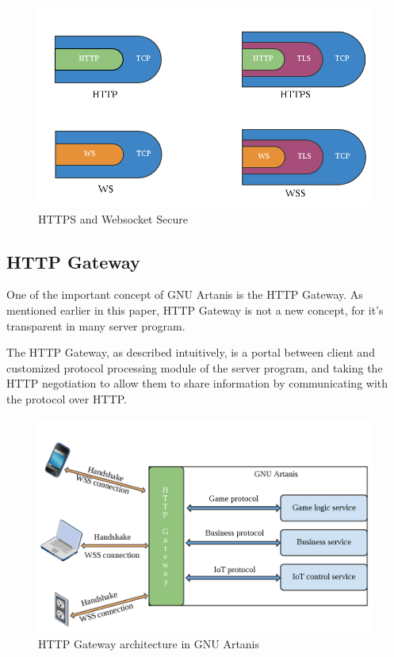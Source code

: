 \documentclass[numbers,numberedpars]{sigplanconf}
\begin{document}
\begin{figure}[tbph]
  \centering
  \label{fig:wss}
  \includegraphics[scale=0.3]{wss.png}
  \caption{HTTPS and Websocket Secure}
\end{figure}

\subsection{HTTP Gateway} \label{HTTP Gateway}

One of the important concept of GNU Artanis is the HTTP Gateway. As mentioned earlier in this paper, HTTP Gateway is not a new concept,
for it's transparent in many server program.

The HTTP Gateway, as described intuitively, is a portal between client and customized protocol processing module of the server program,
and taking the HTTP negotiation to allow them to share information by communicating with the protocol over HTTP.

\begin{figure}[tbph]
  \centering
  \includegraphics[scale=0.25]{httpgw.png}
  \caption{HTTP Gateway architecture in GNU Artanis}
  \label{fig:httpgw}
\end{figure}
\end{document}
